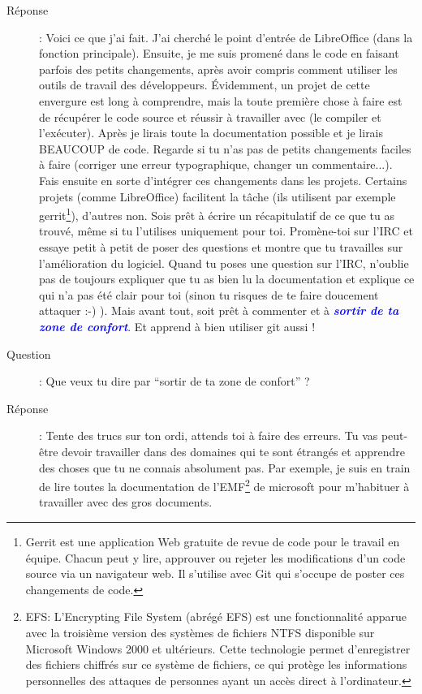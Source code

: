 \documentclass[a4paper,12pt, draft]{report}
\newcommand{\importantPoint}[1]{\textcolor{blue}{\textbf{\textit{#1}}}}
\begin{document}
\begin{description}
\item [Réponse]: Voici ce que j'ai fait. J'ai cherché le point d'entrée de LibreOffice (dans la fonction principale). Ensuite, je me suis promené dans le code en faisant parfois des petits changements, après avoir compris comment utiliser les outils de travail des développeurs. Évidemment, un projet de cette envergure est long à comprendre, mais la toute première chose à faire est de récupérer le code source et réussir à travailler avec (le compiler et l'exécuter). Après je lirais toute la documentation possible et je lirais BEAUCOUP de code. Regarde si tu n'as pas de petits changements faciles à faire (corriger une erreur typographique, changer un commentaire...). Fais ensuite en sorte d'intégrer ces changements dans les projets. Certains projets (comme LibreOffice) facilitent la tâche (ils utilisent par exemple gerrit\footnote{Gerrit est une application Web gratuite de revue de code pour le travail en équipe. Chacun peut y lire, approuver ou rejeter les modifications d'un code source via un navigateur web. Il s'utilise avec Git qui s'occupe de poster ces changements de code.}), d'autres non. Sois prêt à écrire un récapitulatif de ce que tu as trouvé, même si tu l'utilises uniquement pour toi. Promène-toi sur l'IRC et essaye petit à petit de poser des questions et montre que tu travailles sur l'amélioration du logiciel. Quand tu poses une question sur l'IRC, n'oublie pas de toujours expliquer que tu as bien lu la documentation et explique ce qui n'a pas été clair pour toi  (sinon tu risques de te faire doucement attaquer :-) ). Mais avant tout, soit prêt à commenter et à \importantPoint{sortir de ta zone de confort}. Et apprend à bien utiliser git aussi !
\item [Question]:  Que veux tu dire par ``sortir de ta zone de confort'' ?
\item [Réponse]: Tente des trucs sur ton ordi, attends toi à faire des erreurs. Tu vas peut-être devoir travailler dans des domaines qui te sont étrangés et apprendre des choses que tu ne connais absolument pas. Par exemple, je suis en train de lire toutes la documentation de l'EMF\footnote{\textsc{EFS}: L'Encrypting File System (abrégé EFS) est une fonctionnalité apparue avec la troisième version des systèmes de fichiers NTFS disponible sur Microsoft Windows 2000 et ultérieurs. Cette technologie permet d'enregistrer des fichiers chiffrés sur ce système de fichiers, ce qui protège les informations personnelles des attaques de personnes ayant un accès direct à l'ordinateur.} de microsoft pour m'habituer à travailler avec des gros documents.

\end{description}
\end{document}
